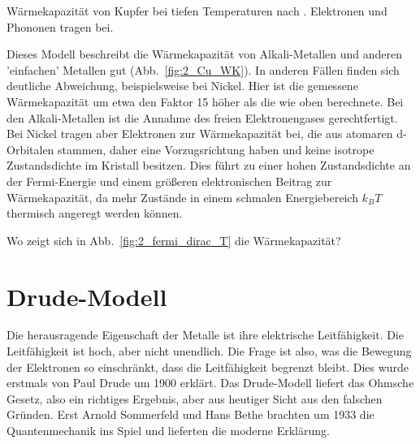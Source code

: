 \begin{marginfigure}
    \caption{Wärmekapazität von Kupfer bei tiefen Temperaturen nach \cite{Rayne1956}. Elektronen und Phononen tragen bei. \label{fig:2_Cu_WK}}
\end{marginfigure}


Dieses Modell beschreibt die Wärmekapazität von Alkali-Metallen und anderen 'einfachen' Metallen gut (Abb.~\ref{fig:2_Cu_WK}). In anderen Fällen finden sich deutliche Abweichung, beispielsweise bei Nickel. Hier ist die gemessene Wärmekapazität um etwa den Faktor  15 höher als die wie oben berechnete. Bei den Alkali-Metallen ist die Annahme des freien Elektronengases gerechtfertigt. Bei Nickel tragen aber Elektronen zur Wärmekapazität bei, die aus atomaren d-Orbitalen stammen, daher eine Vorzugsrichtung haben und keine  isotrope Zustandsdichte im Kristall besitzen. Dies führt zu einer hohen Zustandsdichte an der Fermi-Energie und einem größeren  elektronischen Beitrag zur Wärmekapazität, da mehr Zustände in einem schmalen Energiebereich $k_B T$ thermisch angeregt werden können. 



\begin{questions} 
    \item Wo zeigt sich in Abb.~\ref{fig:2_fermi_dirac_T} die Wärmekapazität?
\end{questions}
    
    



\section{Drude-Modell}

Die herausragende Eigenschaft der Metalle ist ihre elektrische Leitfähigkeit. Die Leitfähigkeit ist hoch, aber nicht unendlich. Die Frage ist also, was die Bewegung der Elektronen so einschränkt, dass die Leitfähigkeit begrenzt bleibt. Dies wurde erstmals von Paul Drude um 1900 erklärt. Das Drude-Modell liefert das Ohmsche Gesetz, also ein richtiges Ergebnis, aber aus heutiger Sicht aus den falschen Gründen. Erst Arnold Sommerfeld und Hans Bethe brachten um 1933 die Quantenmechanik ins Spiel und lieferten die moderne Erklärung.

